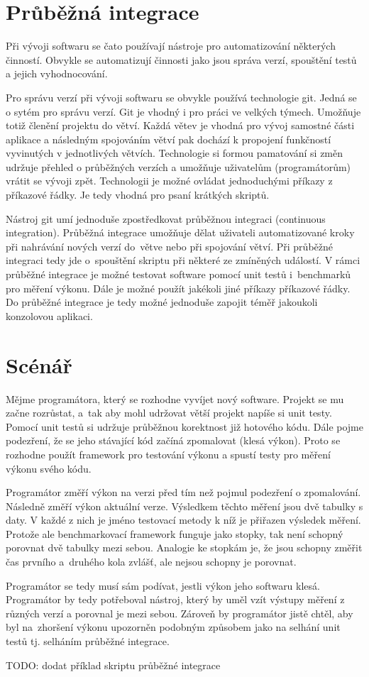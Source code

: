 \section{Průběžná integrace}
Při vývoji softwaru se čato používají nástroje pro automatizování některých činností.
Obvykle se automatizují činnosti jako jsou správa verzí, spouštění testů a jejich vyhodnocování.

Pro správu verzí při vývoji softwaru se obvykle používá technologie git.
Jedná se o sytém pro správu verzí. Git je vhodný i pro práci ve velkých týmech.
Umožňuje totiž členění projektu do větví. Každá větev je vhodná pro vývoj samostné části aplikace
a následným spojováním větví pak dochází k propojení funkčností vyvinutých v jednotlivých větvích.
Technologie si formou pamatování si změn udržuje přehled o průběžných verzích a umožňuje uživatelům (programátorům)
vrátit se vývoji zpět. Technologii je možné ovládat jednoduchými příkazy z příkazové řádky.
Je tedy vhodná pro psaní krátkých skriptů.

Nástroj git umí jednoduše zpostředkovat průběžnou integraci (continuous integration). Průběžná integrace umožňuje dělat uživateli automatizované
kroky při nahrávání nových verzí do~větve nebo při spojování větví. Při průběžné integraci tedy jde o~spouštění
skriptu při některé ze zmíněných událostí. V rámci průběžné integrace je možné testovat software pomocí unit testů
i~benchmarků pro měření výkonu. Dále je možné použít jakékoli jiné příkazy příkazové řádky.
Do průběžné integrace je tedy možné jednoduše zapojit téměř jakoukoli konzolovou aplikaci.

\section{Scénář}
Mějme programátora, který se rozhodne vyvíjet nový software. Projekt se mu začne rozrůstat, a~tak
aby mohl udržovat větší projekt napíše si unit testy. Pomocí unit testů si udržuje průběžnou korektnost
již hotového kódu. Dále pojme podezření, že se jeho stávající kód začíná zpomalovat (klesá výkon). Proto se
rozhodne použít framework pro testování výkonu a spustí testy pro měření výkonu svého kódu.

Programátor změří výkon na verzi před tím než pojmul podezření o zpomalování. Následně změří výkon aktuální verze.
Výsledkem těchto měření jsou dvě tabulky s daty. V každé z nich je jméno testovací metody k níž je přiřazen výsledek
měření. Protože ale benchmarkovací framework funguje jako stopky, tak není schopný porovnat dvě tabulky mezi sebou.
Analogie ke stopkám je, že jsou schopny změřit čas prvního a~druhého kola zvlášť, ale nejsou schopny je porovnat.

Programátor se tedy musí sám podívat, jestli výkon jeho softwaru klesá. Programátor by tedy potřeboval
nástroj, který by uměl vzít výstupy měření z různých verzí a porovnal je mezi sebou. Zároveň by programátor jistě
chtěl, aby byl na~zhoršení výkonu upozorněn podobným způsobem jako na selhání unit testů tj. selháním
průběžné integrace.

TODO: dodat příklad skriptu průběžné integrace
